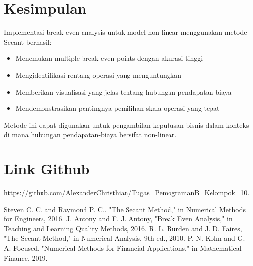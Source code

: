 \documentclass[conference]{IEEEtran}
\begin{document}
\section{Kesimpulan}
Implementasi break-even analysis untuk model non-linear menggunakan metode Secant berhasil:
\begin{itemize}
\item Menemukan multiple break-even points dengan akurasi tinggi
\item Mengidentifikasi rentang operasi yang menguntungkan
\item Memberikan visualisasi yang jelas tentang hubungan pendapatan-biaya
\item Mendemonstrasikan pentingnya pemilihan skala operasi yang tepat
\end{itemize}

Metode ini dapat digunakan untuk pengambilan keputusan bisnis dalam konteks di mana hubungan pendapatan-biaya bersifat non-linear.

\section{Link Github}
\url{https://github.com/AlexanderChristhian/Tugas_PemogramanB_Kelompok_10}.


\begin{thebibliography}{00}
 Steven C. C. and Raymond P. C., "The Secant Method," in Numerical Methods for Engineers, 2016.
 J. Antony and F. J. Antony, "Break Even Analysis," in Teaching and Learning Quality Methods, 2016.
 R. L. Burden and J. D. Faires, "The Secant Method," in Numerical Analysis, 9th ed., 2010.
 P. N. Kolm and G. A. Focused, "Numerical Methods for Financial Applications," in Mathematical Finance, 2019.
\end{thebibliography}
\end{document}

